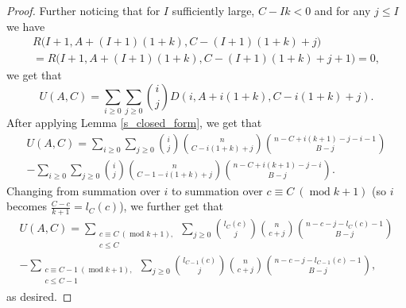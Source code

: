 \documentclass[10pt,a4paper]{amsart}
\newcommand\modd{\operatorname{mod}}
\begin{document}
\begin{proof}
    Further noticing that for $I$ sufficiently large, $C- Ik < 0$ and for any $j \leqslant I$ we have
    \begin{multline*}
        R\Big(I+1, A+(I+1)(1+k), C-(I+1)(1+k)+j\Big)\\ = R\Big(I+1, A+(I+1)(1+k), C-(I+1)(1+k)+j+1\Big) = 0,
    \end{multline*}
    we get that
    \begin{equation*}
        U(A, C) = \sum_{i \geqslant 0} \sum_{j \geqslant 0} \binom{i}{j} D(i, A+i(1+k), C-i(1+k)+j).
    \end{equation*}
    After applying Lemma \ref{s_closed_form}, we get that
    \begin{multline*}
        U(A, C) = \sum_{i \geqslant 0} \sum_{j \geqslant 0} \binom{i}{j} \binom{n}{C-i(1+k)+j} \binom{n-C+i(k+1)-j-i-1}{B-j}\\ - \sum_{i \geqslant 0} \sum_{j \geqslant 0} \binom{i}{j} \binom{n}{C-1-i(1+k)+j} \binom{n-C+i(k+1)-j-i}{B-j}.
    \end{multline*}
    Changing from summation over $i$ to summation over $c \equiv C \ (\modd k+1)$ (so $i$ becomes $\frac{C-c}{k+1}=l_C(c)$), we further get that
    \begin{multline*}
        U(A, C) = \sum_{\substack{c \equiv C \ (\modd k+1), \\ c \leqslant C}} \sum_{j \geqslant 0} \binom{l_C(c)}{j} \binom{n}{c+j} \binom{n-c-j-l_C(c)-1}{B-j}\\ - \sum_{\substack{c \equiv C-1 \ (\modd k+1), \\ c \leqslant C-1}} \sum_{j \geqslant 0} \binom{l_{C-1}(c)}{j} \binom{n}{c+j} \binom{n-c-j-l_{C-1}(c)-1}{B-j},
    \end{multline*}
    as desired.


\end{proof}
\end{document}
